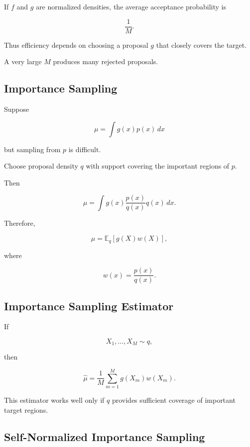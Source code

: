 If \(f\) and \(g\) are normalized densities, the average acceptance
probability is

\[
\boxed{
\frac1M.
}
\]

Thus efficiency depends on choosing a proposal \(g\) that closely covers
the target.

A very large \(M\) produces many rejected proposals.

\subsection{Importance Sampling}
\label{subsec:importance-sampling}

Suppose

\[
\mu
=
\int
g(x)
p(x)\,dx
\]

but sampling from \(p\) is difficult.

Choose proposal density \(q\) with support covering the important regions
of \(p\).

Then

\[
\mu
=
\int
g(x)
\frac{
p(x)
}{
q(x)
}
q(x)\,dx.
\]

Therefore,

\[
\boxed{
\mu
=
\mathbb{E}_q
[
g(X)w(X)
],
}
\]

where

\[
\boxed{
w(x)
=
\frac{
p(x)
}{
q(x)
}.
}
\]

\subsection{Importance Sampling Estimator}
\label{subsec:importance-sampling-estimator}

If

\[
X_1,\ldots,X_M
\sim
q,
\]

then

\[
\boxed{
\widehat{\mu}
=
\frac1M
\sum_{m=1}^{M}
g(X_m)
w(X_m).
}
\]

This estimator works well only if \(q\) provides sufficient coverage of
important target regions.

\subsection{Self-Normalized Importance Sampling}
\label{subsec:self-normalized-importance}

